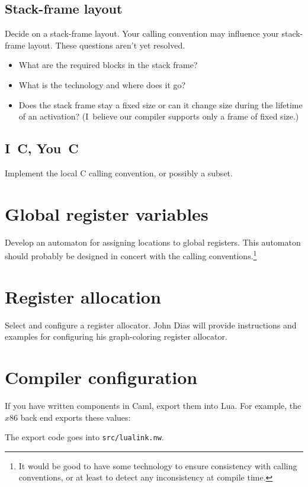\documentclass[12pt]{article}
\begin{document}
\subsection{Stack-frame layout}

Decide on a stack-frame layout.
Your calling convention may influence your stack-frame layout.
These questions aren't yet resolved.
\begin{itemize}
\item
What are the required blocks in the stack frame?
\item
What is the technology and where does it go?
\item
Does the stack frame stay a fixed size or can it change size during
the lifetime of an activation? 
(I~believe our compiler supports only a frame of fixed size.)
\end{itemize}


\subsection{I~C, You~C}

Implement the local C calling convention, or possibly a subset.


\section{Global register variables}

Develop an automaton for assigning locations to global registers.
This automaton should probably be designed in concert with the calling
conventions.\footnote
{It would be good to have some technology to ensure consistency with
calling conventions, or at least to detect any inconsistency at
compile time.}


\section{Register allocation}

Select and configure a register allocator.
John Dias will provide instructions and examples for configuring his
graph-coloring register allocator.

\section{Compiler configuration}

If you have written components in Caml, export them into Lua.
For example, the $x$86 back end exports these values:\\
The export code goes into \texttt{src/lualink.nw}.
\end{document}

